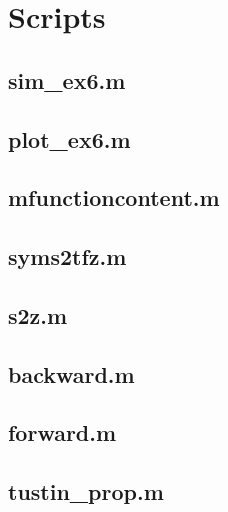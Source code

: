 \section*{Scripts}
    \subsection*{sim\_ex6.m}
    \label{subsec:syms2tfz}
    

    \subsection*{plot\_ex6.m}
    \label{subsec:syms2tfz}
    
    
    \subsection*{mfunctioncontent.m}
    \label{subsec:syms2tfz}
    

    \subsection*{syms2tfz.m}
    \label{subsec:syms2tfz}
    
    
    \subsection*{s2z.m}
    \label{subsec:s2z}
    
    
    \subsection*{backward.m}
    \label{subsec:backward}
    
    
    \subsection*{forward.m}
    \label{subsec:forward}
    
    
    \subsection*{tustin\_prop.m}
    \label{subsec:tustin}
    